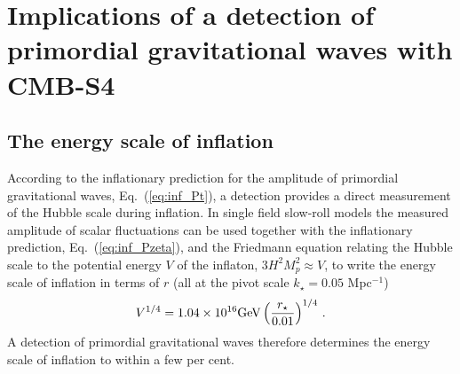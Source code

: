 
\section{Implications of a detection of primordial gravitational waves with CMB-S4}
\label{sec:detection}

\subsection{The energy scale of inflation}
\label{sec:scale-of-inflation}
According to the inflationary prediction for the amplitude of primordial gravitational waves, Eq.~(\ref{eq:inf_Pt}), a detection provides a direct measurement of the Hubble scale during inflation. In single field slow-roll models the measured amplitude of scalar fluctuations can be used together with the inflationary prediction, Eq.~(\ref{eq:inf_Pzeta}), and the Friedmann equation relating the Hubble scale to the potential energy $V$ of the inflaton, $3H^2M_p^2\approx V$, to write the energy scale of inflation in terms of $r$ (all at the pivot scale $k_\star=0.05$ Mpc$^{-1}$)
\begin{equation}\label{eq:Vofr}
V^{1/4}=1.04\times 10^{16}{\rm GeV}\left(\frac{r_\star}{0.01}\right)^{1/4}\,.
\end{equation}
A detection of primordial gravitational waves therefore determines the energy scale of inflation to within a few per cent. 

